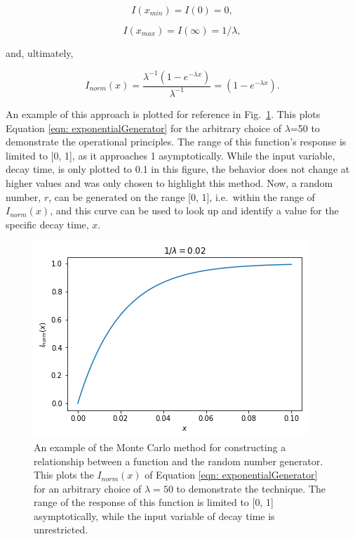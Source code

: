 \begin{equation}
I(x_{min}) = I(0) = 0,
\end{equation}

\begin{equation}
I(x_{max}) = I(\infty) = 1/\lambda,
\end{equation}

\noindent and, ultimately, 

\begin{equation}
I_{norm}(x) = \frac{\lambda^{-1}(1 - e^{-\lambda x})}{\lambda^{-1}} = (1 - e^{-\lambda x}).
\label{eqn: exponentialGenerator}
\end{equation}

\noindent An example of this approach is plotted for reference in Fig.\ \ref{fig: expoGen}. This plots Equation \ref{eqn: exponentialGenerator} for the arbitrary choice of $\lambda$=50 to demonstrate the operational principles. The range of this function's response is limited to [0, 1], as it approaches 1 asymptotically. While the input variable, decay time, is only plotted to 0.1 in this figure, the behavior does not change at higher values and was only chosen to highlight this method. Now, a random number, $r$, can be generated on the range [0, 1], i.e.\ within the range of $I_{norm}(x)$, and this curve can be used to look up and identify a value for the specific decay time, $x$. 



\begin{figure}
\centering
\includegraphics[width=0.85\linewidth]{figures/expoDecayGenerator.png}
\caption{An example of the Monte Carlo method for constructing a relationship between a function and the random number generator. This plots the $I_{norm}(x)$ of Equation \ref{eqn: exponentialGenerator} for an arbitrary choice of $\lambda = 50$ to demonstrate the technique. The range of the response of this function is limited to [0, 1] asymptotically, while the input variable of decay time is unrestricted. }
\label{fig: expoGen}
\end{figure}


